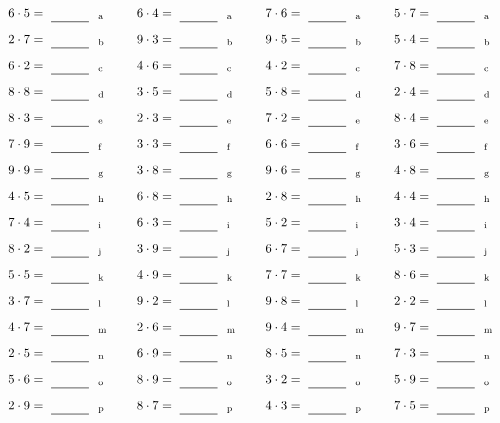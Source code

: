 \documentclass
[
  draft    = true,
  fontsize = 11pt,
  parskip  = half-
]
{scrartcl}
\begin{document}
\par\vfill\par
\begin{align*}
    \pline{6\cdot5}&=\rline{a}
  & \pline{6\cdot4}&=\rline{a}
  & \pline{7\cdot6}&=\rline{a}
  & \pline{5\cdot7}&=\rline{a} \\[1ex]
    \pline{2\cdot7}&=\rline{b}
  & \pline{9\cdot3}&=\rline{b}
  & \pline{9\cdot5}&=\rline{b}
  & \pline{5\cdot4}&=\rline{b} \\[1ex]
    \pline{6\cdot2}&=\rline{c}
  & \pline{4\cdot6}&=\rline{c}
  & \pline{4\cdot2}&=\rline{c}
  & \pline{7\cdot8}&=\rline{c} \\[1ex]
    \pline{8\cdot8}&=\rline{d}
  & \pline{3\cdot5}&=\rline{d}
  & \pline{5\cdot8}&=\rline{d}
  & \pline{2\cdot4}&=\rline{d} \\[1ex]
    \pline{8\cdot3}&=\rline{e}
  & \pline{2\cdot3}&=\rline{e}
  & \pline{7\cdot2}&=\rline{e}
  & \pline{8\cdot4}&=\rline{e} \\[1ex]
    \pline{7\cdot9}&=\rline{f}
  & \pline{3\cdot3}&=\rline{f}
  & \pline{6\cdot6}&=\rline{f}
  & \pline{3\cdot6}&=\rline{f} \\[1ex]
    \pline{9\cdot9}&=\rline{g}
  & \pline{3\cdot8}&=\rline{g}
  & \pline{9\cdot6}&=\rline{g}
  & \pline{4\cdot8}&=\rline{g} \\[1ex]
    \pline{4\cdot5}&=\rline{h}
  & \pline{6\cdot8}&=\rline{h}
  & \pline{2\cdot8}&=\rline{h}
  & \pline{4\cdot4}&=\rline{h} \\[1ex]
    \pline{7\cdot4}&=\rline{i}
  & \pline{6\cdot3}&=\rline{i}
  & \pline{5\cdot2}&=\rline{i}
  & \pline{3\cdot4}&=\rline{i} \\[1ex]
    \pline{8\cdot2}&=\rline{j}
  & \pline{3\cdot9}&=\rline{j}
  & \pline{6\cdot7}&=\rline{j}
  & \pline{5\cdot3}&=\rline{j} \\[1ex]
    \pline{5\cdot5}&=\rline{k}
  & \pline{4\cdot9}&=\rline{k}
  & \pline{7\cdot7}&=\rline{k}
  & \pline{8\cdot6}&=\rline{k} \\[1ex]
    \pline{3\cdot7}&=\rline{l}
  & \pline{9\cdot2}&=\rline{l}
  & \pline{9\cdot8}&=\rline{l}
  & \pline{2\cdot2}&=\rline{l} \\[1ex]
    \pline{4\cdot7}&=\rline{m}
  & \pline{2\cdot6}&=\rline{m}
  & \pline{9\cdot4}&=\rline{m}
  & \pline{9\cdot7}&=\rline{m} \\[1ex]
    \pline{2\cdot5}&=\rline{n}
  & \pline{6\cdot9}&=\rline{n}
  & \pline{8\cdot5}&=\rline{n}
  & \pline{7\cdot3}&=\rline{n} \\[1ex]
    \pline{5\cdot6}&=\rline{o}
  & \pline{8\cdot9}&=\rline{o}
  & \pline{3\cdot2}&=\rline{o}
  & \pline{5\cdot9}&=\rline{o} \\[1ex]
    \pline{2\cdot9}&=\rline{p}
  & \pline{8\cdot7}&=\rline{p}
  & \pline{4\cdot3}&=\rline{p}
  & \pline{7\cdot5}&=\rline{p}
\end{align*}
\end{document}
